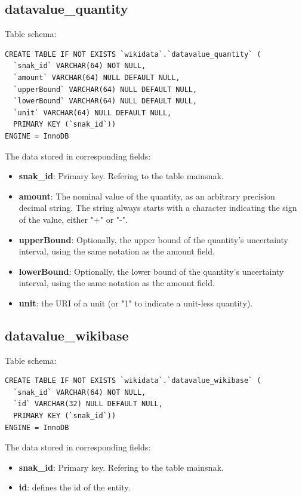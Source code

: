 \documentclass[12pt]{article}
\begin{document}
\subsection{datavalue\_quantity}
\lstset{language=SQL}
Table schema:
\begin{lstlisting}
CREATE TABLE IF NOT EXISTS `wikidata`.`datavalue_quantity` (
  `snak_id` VARCHAR(64) NOT NULL,
  `amount` VARCHAR(64) NULL DEFAULT NULL,
  `upperBound` VARCHAR(64) NULL DEFAULT NULL,
  `lowerBound` VARCHAR(64) NULL DEFAULT NULL,
  `unit` VARCHAR(64) NULL DEFAULT NULL,
  PRIMARY KEY (`snak_id`))
ENGINE = InnoDB
\end{lstlisting}
The data stored in corresponding fields:
\begin{itemize}
\item \textbf{snak\_id}: Primary key. Refering to the table mainsnak.
\item \textbf{amount}: The nominal value of the quantity, as an arbitrary precision decimal string. The string always starts with a character indicating the sign of the value, either "+" or "-".
\item \textbf{upperBound}: Optionally, the upper bound of the quantity's uncertainty interval, using the same notation as the amount field.
\item \textbf{lowerBound}: Optionally, the lower bound of the quantity's uncertainty interval, using the same notation as the amount field.
\item \textbf{unit}: the URI of a unit (or "1" to indicate a unit-less quantity).
\end{itemize}
\subsection{datavalue\_wikibase}
\lstset{language=SQL}
Table schema:
\begin{lstlisting}
CREATE TABLE IF NOT EXISTS `wikidata`.`datavalue_wikibase` (
  `snak_id` VARCHAR(64) NOT NULL,
  `id` VARCHAR(32) NULL DEFAULT NULL,
  PRIMARY KEY (`snak_id`))
ENGINE = InnoDB
\end{lstlisting}
The data stored in corresponding fields:
\begin{itemize}
\item \textbf{snak\_id}: Primary key. Refering to the table mainsnak.
\item \textbf{id}: defines the id of the entity.
\end{itemize}
\end{document}
